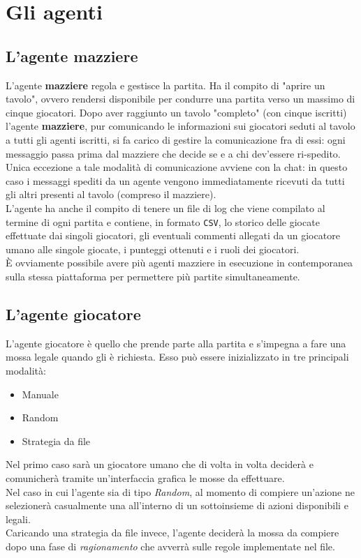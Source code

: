 \section{Gli agenti}

\subsection{L'agente mazziere}

L'agente \textbf{mazziere} regola e gestisce la partita.
Ha il compito di "aprire un tavolo", ovvero rendersi disponibile per condurre una partita verso un massimo di cinque giocatori.
Dopo aver raggiunto un tavolo "completo" (con cinque iscritti) l'agente \textbf{mazziere}, pur comunicando le informazioni sui giocatori seduti al tavolo a tutti gli agenti iscritti, si fa carico di gestire la comunicazione fra di essi: ogni messaggio passa prima dal mazziere che decide se e a chi dev'essere ri-spedito.\\
Unica eccezione a tale modalità di comunicazione avviene con la chat: in questo caso i messaggi spediti da un agente vengono immediatamente ricevuti da tutti gli altri presenti al tavolo (compreso il mazziere).\\
L'agente ha anche il compito di tenere un file di log che viene compilato al termine di ogni partita e contiene, in formato \texttt{CSV}, lo storico delle giocate effettuate dai singoli giocatori, gli eventuali commenti allegati da un giocatore umano alle singole giocate, i punteggi ottenuti e i ruoli dei giocatori.\\
È ovviamente possibile avere più agenti mazziere in esecuzione in contemporanea sulla stessa piattaforma per permettere più partite simultaneamente.\\

\subsection{L'agente giocatore}

L'agente giocatore è quello che prende parte alla partita e s'impegna a fare una mossa legale quando gli è richiesta.
Esso può essere inizializzato in tre principali modalità:
\begin{itemize}
   \item Manuale
   \item Random
   \item Strategia da file 
\end{itemize}
Nel primo caso sarà un giocatore umano che di volta in volta deciderà e comunicherà tramite un'interfaccia grafica le mosse da effettuare.\\
Nel caso in cui l'agente sia di tipo \emph{Random}, al momento di compiere un'azione ne selezionerà casualmente una all'interno di un sottoinsieme di azioni disponibili e legali.\\
Caricando una strategia da file invece, l'agente deciderà la mossa da compiere dopo una fase di \emph{ragionamento} che avverrà sulle regole implementate nel file.\\



